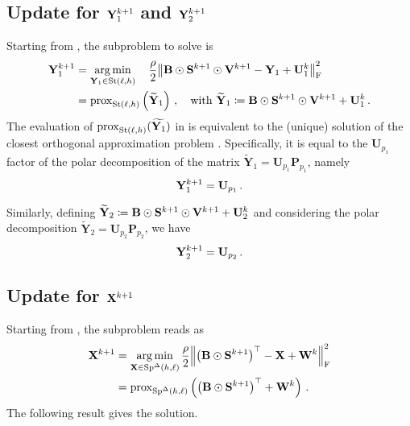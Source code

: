 \subsection{\texorpdfstring{Update for $\mathbf{Y}_1^{k+1}$ and $\mathbf{Y}_2^{k+1}$}{Update for Y1 and Y2}}
Starting from , the subproblem to solve is
\begin{equation}\label{eq:updateY1_partial}
    \begin{aligned}
        \mathbf{Y}_1^{k+1}&=\operatorname*{arg\,min}_{\mathbf{Y}_1 \in \mathrm{St}({\ell},{h})}\quad \frac{\rho}{2}\norm{\mathbf{B} \odot \mathbf{S}^{k+1} \odot \mathbf{V}^{k+1} - \mathbf{Y}_1 +\mathbf{U}_1^k}_{\mathrm{F}}^2\\
                &=\mathrm{prox}_{\mathrm{St}({\ell},{h})}\left(\widetilde{\mathbf{Y}}_1\right)\,, \quad \text{with } \widetilde{\mathbf{Y}}_1\coloneqq\mathbf{B} \odot \mathbf{S}^{k+1} \odot \mathbf{V}^{k+1} +\mathbf{U}_1^k\,.
    \end{aligned}            
\end{equation}
The evaluation of $\mathrm{prox}_{\mathrm{St}({\ell},{h})}(\widetilde{\mathbf{Y}_1})$ in  is equivalent to the (unique) solution of the closest orthogonal approximation problem .
Specifically, it is equal to the $\mathbf{U}_{p_1}$ factor of the polar decomposition of the matrix $\widetilde{\mathbf{Y}}_1=\mathbf{U}_{p_1} \mathbf{P}_{p_1}$, namely
\begin{equation}\label{eq:updateY1_solution}
    \mathbf{Y}_1^{k+1}=\mathbf{U}_{p_1}\,.
\end{equation}

Similarly, defining $\widetilde{\mathbf{Y}}_2\coloneqq\mathbf{B} \odot \mathbf{S}^{k+1} \odot \mathbf{V}^{k+1} +\mathbf{U}_2^k$ and considering the polar decomposition $\widetilde{\mathbf{Y}}_2=\mathbf{U}_{p_2} \mathbf{P}_{p_2}$, we have
\begin{equation}\label{eq:updateY2_solution}
    \mathbf{Y}_2^{k+1}=\mathbf{U}_{p_2} \,.
\end{equation}

\subsection{\texorpdfstring{Update for $\mathbf{X}^{k+1}$}{Update for X}}
Starting from , the subproblem reads as
\begin{equation}\label{eq:updateX_partial}
    \begin{aligned}
        \mathbf{X}^{k+1}&= \operatorname*{arg\,min}_{\mathbf{X} \in \mathrm{Sp}^{\Delta}({h},{\ell})} \frac{\rho}{2}\norm{\left(\mathbf{B} \odot \mathbf{S}^{k+1}\right)^\top - \mathbf{X} + \mathbf{W}^k}_{\mathrm{F}}^2\\
                &= \mathrm{prox}_{\mathrm{Sp}^{\Delta}({h},{\ell})}\left(\left(\mathbf{B} \odot \mathbf{S}^{k+1}\right)^\top + \mathbf{W}^k\right)\,.
    \end{aligned}
\end{equation}
The following result gives the solution.

